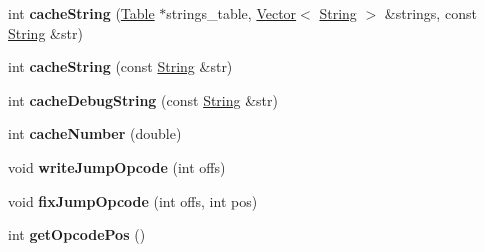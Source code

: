 \begin{DoxyCompactItemize}
\item 
int {\bfseries cache\+String} (\hyperlink{struct_object_script_1_1_o_s_1_1_core_1_1_table}{Table} $\ast$strings\+\_\+table, \hyperlink{struct_object_script_1_1_o_s_1_1_vector}{Vector}$<$ \hyperlink{class_object_script_1_1_o_s_1_1_core_1_1_string}{String} $>$ \&strings, const \hyperlink{class_object_script_1_1_o_s_1_1_core_1_1_string}{String} \&str)\hypertarget{class_object_script_1_1_o_s_1_1_core_1_1_compiler_a50b8c57f57091445d8355ecc4a7593e3}{}\label{class_object_script_1_1_o_s_1_1_core_1_1_compiler_a50b8c57f57091445d8355ecc4a7593e3}

\item 
int {\bfseries cache\+String} (const \hyperlink{class_object_script_1_1_o_s_1_1_core_1_1_string}{String} \&str)\hypertarget{class_object_script_1_1_o_s_1_1_core_1_1_compiler_a914b4a413bcefcfa01815d070e4cfc8b}{}\label{class_object_script_1_1_o_s_1_1_core_1_1_compiler_a914b4a413bcefcfa01815d070e4cfc8b}

\item 
int {\bfseries cache\+Debug\+String} (const \hyperlink{class_object_script_1_1_o_s_1_1_core_1_1_string}{String} \&str)\hypertarget{class_object_script_1_1_o_s_1_1_core_1_1_compiler_a68d4b26ae5927acae97cc08f19f7d7e7}{}\label{class_object_script_1_1_o_s_1_1_core_1_1_compiler_a68d4b26ae5927acae97cc08f19f7d7e7}

\item 
int {\bfseries cache\+Number} (double)\hypertarget{class_object_script_1_1_o_s_1_1_core_1_1_compiler_a9d684105c28356cdfd85a9bfcc1bd4a3}{}\label{class_object_script_1_1_o_s_1_1_core_1_1_compiler_a9d684105c28356cdfd85a9bfcc1bd4a3}

\item 
void {\bfseries write\+Jump\+Opcode} (int offs)\hypertarget{class_object_script_1_1_o_s_1_1_core_1_1_compiler_a354fc220fdd555560f150a65b4d2dc3f}{}\label{class_object_script_1_1_o_s_1_1_core_1_1_compiler_a354fc220fdd555560f150a65b4d2dc3f}

\item 
void {\bfseries fix\+Jump\+Opcode} (int offs, int pos)\hypertarget{class_object_script_1_1_o_s_1_1_core_1_1_compiler_ab333d262133868721f0f6b6afc87a4ab}{}\label{class_object_script_1_1_o_s_1_1_core_1_1_compiler_ab333d262133868721f0f6b6afc87a4ab}

\item 
int {\bfseries get\+Opcode\+Pos} ()\hypertarget{class_object_script_1_1_o_s_1_1_core_1_1_compiler_afb1fea94d18c177c7f3702816962a025}{}\label{class_object_script_1_1_o_s_1_1_core_1_1_compiler_afb1fea94d18c177c7f3702816962a025}


\end{DoxyCompactItemize}
